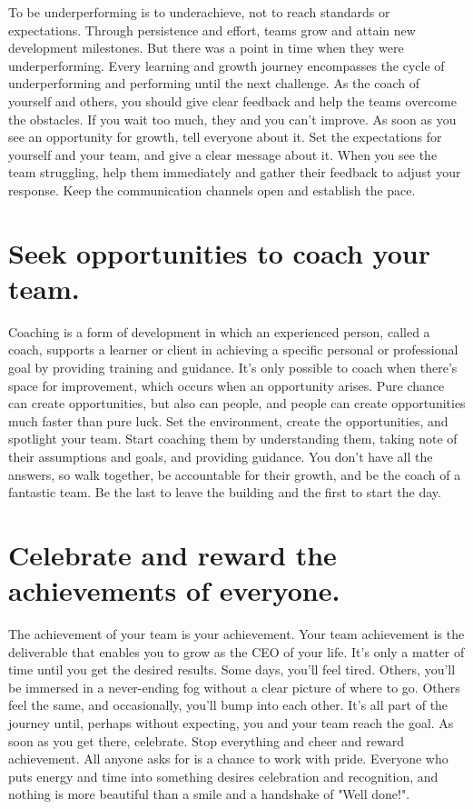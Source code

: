 \documentclass[10pt,a4paper]{book}
\begin{document}
To be underperforming is to underachieve, not to reach standards or expectations. Through persistence and effort, teams grow and attain new development milestones. But there was a point in time when they were underperforming. Every learning and growth journey encompasses the cycle of underperforming and performing until the next challenge. As the coach of yourself and others, you should give clear feedback and help the teams overcome the obstacles. If you wait too much, they and you can't improve. As soon as you see an opportunity for growth, tell everyone about it. Set the expectations for yourself and your team, and give a clear message about it. When you see the team struggling, help them immediately and gather their feedback to adjust your response. Keep the communication channels open and establish the pace.

\section{Seek opportunities to coach your team.}

Coaching is a form of development in which an experienced person, called a coach, supports a learner or client in achieving a specific personal or professional goal by providing training and guidance. It's only possible to coach when there's space for improvement, which occurs when an opportunity arises. Pure chance can create opportunities, but also can people, and people can create opportunities much faster than pure luck. Set the environment, create the opportunities, and spotlight your team. Start coaching them by understanding them, taking note of their assumptions and goals, and providing guidance. You don't have all the answers, so walk together, be accountable for their growth, and be the coach of a fantastic team. Be the last to leave the building and the first to start the day.

\section{Celebrate and reward the achievements of everyone.}

The achievement of your team is your achievement. Your team achievement is the deliverable that enables you to grow as the CEO of your life. It's only a matter of time until you get the desired results. Some days, you'll feel tired. Others, you'll be immersed in a never-ending fog without a clear picture of where to go. Others feel the same, and occasionally, you'll bump into each other. It's all part of the journey until, perhaps without expecting, you and your team reach the goal. As soon as you get there, celebrate. Stop everything and cheer and reward achievement. All anyone asks for is a chance to work with pride. Everyone who puts energy and time into something desires celebration and recognition, and nothing is more beautiful than a smile and a handshake of "Well done!".
\end{document}

